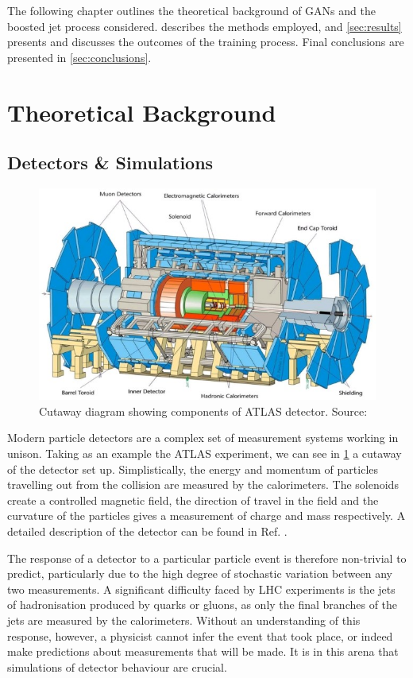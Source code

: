 \documentclass[twocolumn,twoside]{article}
\begin{document}
The following chapter outlines the theoretical background of GANs and the boosted jet process considered.  describes the methods employed, and \cref{sec:results} presents and discusses the outcomes of the training process. Final conclusions are presented in \cref{sec:conclusions}.
	 
\section{Theoretical Background}
\label{sec:theory}


\subsection{Detectors \& Simulations}
\label{sec:detector}

\begin{figure}[H]
	\centering
	\includegraphics[width=0.8\linewidth]{atlasdetector}
	
	\caption{Cutaway diagram showing components of ATLAS detector. Source: \cite{atlaspic}}
	\label{fig:atlaspic}
	
\end{figure}


Modern particle detectors are a complex set of measurement systems working in unison. Taking as an example the ATLAS experiment, we can see in \cref{fig:atlaspic} a cutaway of the detector set up. Simplistically, the energy and momentum of particles travelling out from the collision are measured by the calorimeters. The solenoids create a controlled magnetic field, the direction of travel in the field and the curvature of the particles gives a measurement of charge and mass respectively. A detailed description of the detector can be found in Ref. \cite{armstrong}.

The response of a detector to a particular particle event is therefore non-trivial to predict, particularly due to the high degree of stochastic variation between any two measurements. A significant difficulty faced by LHC experiments is the jets of hadronisation produced by quarks or gluons, as only the final branches of the jets are measured by the calorimeters. Without an understanding of this response, however, a physicist cannot infer the event that took place, or indeed make predictions about measurements that will be made. It is in this arena that simulations of detector behaviour are crucial. 
\end{document}
